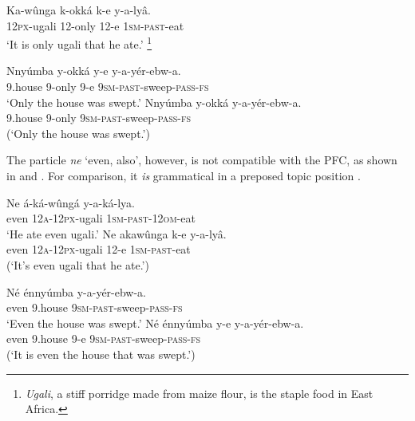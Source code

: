 \documentclass[output=paper]{langsci/langscibook}
\begin{document}
\ea\label{ex:vanderwal:20}
\gll   Ka-wûnga  k-okká    k-e  y-a-lyâ.{} \\
       \textsc{12px}-ugali  12-only  12-e  \textsc{1sm}-\textsc{past}-eat\\
\glt   ‘It is only ugali that he ate.’{} \footnote{\textit{Ugali}, a stiff porridge made from maize flour, is the staple food in East Africa.}
\z

\ea\label{ex:vanderwal:21}
\ea\label{ex:vanderwal:21a}
\gll      Nnyúmba  y-okká  y-e  y-a-yér-ebw-a.\\
         9.house  9-only  9-e  \textsc{9sm}-\textsc{past}-sweep-\textsc{pass}-\textsc{fs}\\
\glt     ‘Only the house was swept.’
\ex\label{ex:vanderwal:21b}
\gll     *Nnyúmba  y-okká    y-a-yér-ebw-a.\\
         9.house  9-only    \textsc{9sm}-\textsc{past}-sweep-\textsc{pass}-\textsc{fs}\\
\glt     (‘Only the house was swept.’)
\z
\z

The particle \textit{ne} ‘even, also’, however, is not compatible with the PFC, as shown in  and . For comparison, it \textit{is} grammatical in a preposed topic position .

\ea\label{ex:vanderwal:22}
\ea\label{ex:vanderwal:22a}
\gll     Ne  á-ká-wûngá    y-a-ká-lya.\\
         even  \textsc{12a}-\textsc{12px}-ugali  \textsc{1sm}-\textsc{past}-\textsc{12om}-eat\\
\glt     ‘He ate even ugali.’
\ex \label{ex:vanderwal:22b}
\gll     *Ne  akawûnga    k-e  y-a-lyâ.\\
         even  \textsc{12a}-\textsc{12px}-ugali  12-e  \textsc{1sm}-\textsc{past}-eat\\
\glt     (‘It’s even ugali that he ate.’)
\z
\z

\ea\label{ex:vanderwal:23}
\ea\label{ex:vanderwal:23a}
\gll     Né  énnyúmba  y-a-yér-ebw-a.\\
         even  9.house  \textsc{9sm}-\textsc{past}-sweep-\textsc{pass}-\textsc{fs}\\
\glt     ‘Even the house was swept.’
\ex\label{ex:vanderwal:23b}
\gll      *Né  énnyúmba  y-e  y-a-yér-ebw-a.\\
         even  9.house  9-e  \textsc{9sm}-\textsc{past}-sweep-\textsc{pass}-\textsc{fs}\\
\glt     (‘It is even the house that was swept.’)
\z
\z
\end{document}
